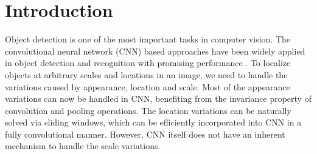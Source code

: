\documentclass[10pt,twocolumn,letterpaper]{article}
\begin{document}
\section{Introduction}
\label{intro}
Object detection is one of the most important tasks in computer vision. The convolutional neural network (CNN) based approaches have been widely applied in object detection and recognition with promising performance \cite{fast_rcnn,resNet,faster_rcnn,zeng2016crafting,yu2016poi,liu2017quality,leng20163d, li2017we, liu2017learning}. To localize objects at arbitrary scales and locations in an image, we need to handle the variations caused by appearance, location and scale. Most of the appearance variations can now be handled in CNN, benefiting from the invariance property of convolution and pooling operations. The location variations can be naturally solved via sliding windows, which can be efficiently incorporated into CNN in a fully convolutional manner. However, CNN itself does not have an inherent mechanism to handle the scale variations. 
\end{document}
